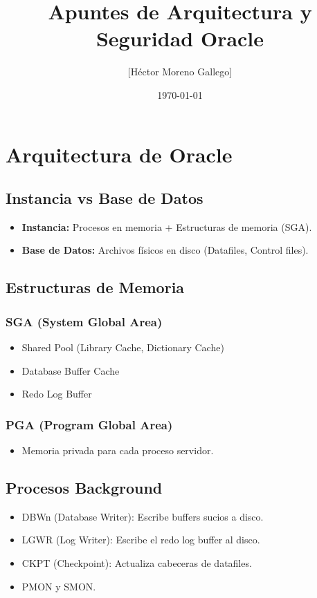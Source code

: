 \documentclass[11pt]{article}
\author{{[}Héctor Moreno Gallego]}
\date{\today}
\title{Apuntes de Arquitectura y Seguridad Oracle}
\begin{document}
\maketitle
\tableofcontents

\section{Arquitectura de Oracle}
\label{sec:orgdcb90bf}
\subsection{Instancia vs Base de Datos}
\label{sec:org124ca3c}
\begin{itemize}
\item \textbf{Instancia:} Procesos en memoria + Estructuras de memoria (SGA).
\item \textbf{Base de Datos:} Archivos físicos en disco (Datafiles, Control files).
\end{itemize}
\subsection{Estructuras de Memoria}
\label{sec:org452cf3e}
\subsubsection{SGA (System Global Area)}
\label{sec:orgdbc9309}
\begin{itemize}
\item Shared Pool (Library Cache, Dictionary Cache)
\item Database Buffer Cache
\item Redo Log Buffer
\end{itemize}
\subsubsection{PGA (Program Global Area)}
\label{sec:orgfba5e62}
\begin{itemize}
\item Memoria privada para cada proceso servidor.
\end{itemize}
\subsection{Procesos Background}
\label{sec:orgade347c}
\begin{itemize}
\item DBWn (Database Writer): Escribe buffers sucios a disco.
\item LGWR (Log Writer): Escribe el redo log buffer al disco.
\item CKPT (Checkpoint): Actualiza cabeceras de datafiles.
\item PMON y SMON.
\end{itemize}
\end{document}
